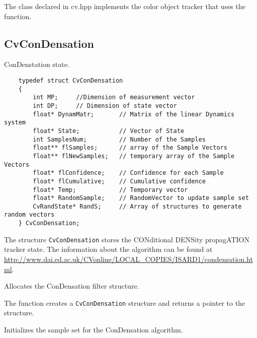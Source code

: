 The  class declared in cv.hpp implements the color object tracker that uses the function.

\ifC %
\subsection{CvConDensation}
ConDenstation state.

\begin{lstlisting}
    typedef struct CvConDensation
    {
        int MP;     //Dimension of measurement vector
        int DP;     // Dimension of state vector
        float* DynamMatr;       // Matrix of the linear Dynamics system
        float* State;           // Vector of State
        int SamplesNum;         // Number of the Samples
        float** flSamples;      // array of the Sample Vectors
        float** flNewSamples;   // temporary array of the Sample Vectors
        float* flConfidence;    // Confidence for each Sample
        float* flCumulative;    // Cumulative confidence
        float* Temp;            // Temporary vector
        float* RandomSample;    // RandomVector to update sample set
        CvRandState* RandS;     // Array of structures to generate random vectors
    } CvConDensation;

\end{lstlisting}
The structure \texttt{CvConDensation} stores the CONditional DENSity propagATION tracker state. The information about the algorithm can be found at \url{http://www.dai.ed.ac.uk/CVonline/LOCAL\_COPIES/ISARD1/condensation.html}.

Allocates the ConDensation filter structure.


\begin{description}
\end{description}

The function creates a \texttt{CvConDensation} structure and returns a pointer to the structure.

Initializes the sample set for the ConDensation algorithm.

